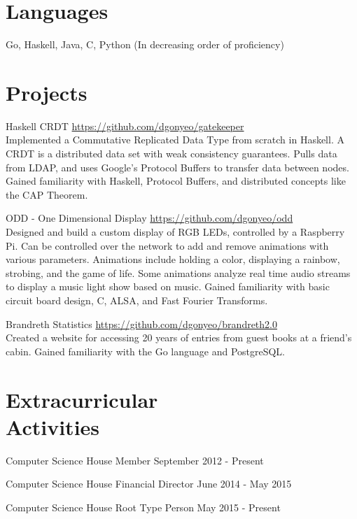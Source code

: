 \documentclass[letterpaper,margin,line,11pt]{resume}
\newcommand{\rurl}[1]{\hfill {\footnotesize \url{#1}}}
\begin{document}
\begin{resume}
\section{\mysidestyle Languages}
    Go, Haskell, Java, C, Python
    \hfill 
    \footnotesize 
    (In decreasing order of proficiency)
    \normalsize

\section{\mysidestyle Projects}
    \begin{compactdesc}
        \item[Haskell CRDT] \rurl{https://github.com/dgonyeo/gatekeeper} \\
            Implemented a Commutative Replicated Data Type from scratch in Haskell. A CRDT is a distributed data set with weak consistency guarantees. Pulls data from LDAP, and uses Google's Protocol Buffers to transfer data between nodes. Gained familiarity with Haskell, Protocol Buffers, and distributed concepts like the CAP Theorem.
        \item[ODD - One Dimensional Display] \rurl{https://github.com/dgonyeo/odd} \\
            Designed and build a custom display of RGB LEDs, controlled by a Raspberry Pi. Can be controlled over the network to add and remove animations with various parameters. Animations include holding a color, displaying a rainbow, strobing, and the game of life. Some animations analyze real time audio streams to display a music light show based on music. Gained familiarity with basic circuit board design, C, ALSA, and Fast Fourier Transforms.
        \item[Brandreth Statistics] \rurl{https://github.com/dgonyeo/brandreth2.0} \\
            Created a website for accessing 20 years of entries from guest books at a friend's cabin. Gained familiarity with the Go language and PostgreSQL.
    \end{compactdesc}

\section{\mysidestyle Extracurricular \\ Activities}
    \begin{asparablank}
        \item Computer Science House Member \hfill September 2012 - Present
        \item Computer Science House Financial Director \hfill June 2014 - May 2015
        \item Computer Science House Root Type Person \hfill May 2015 - Present
    \end{asparablank}

\end{resume}
\end{document}
